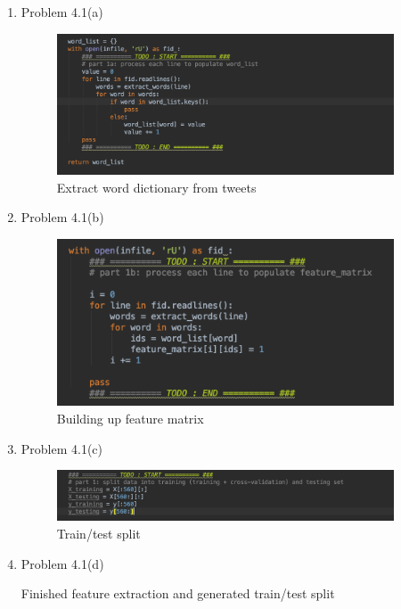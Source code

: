 \documentclass[11pt]{article}
\newcommand{\solution}[1]{{{\color{black}{\bf Solution:} {#1}}}}
\begin{document}
\begin{enumerate}

\item Problem 4.1(a)

\solution{
	
	
	\begin{figure}[h!]
	\centering
	\includegraphics[width = 10cm]{4a}
	\caption{Extract word dictionary from tweets}
	\end{figure}
}

\vspace{2cm}

\item Problem 4.1(b)

\solution{
	
	\begin{figure}[h!]
	\centering
	\includegraphics[width = 10cm]{4b}
	\caption{Building up feature matrix}
	\end{figure}
}

\vspace{2cm}

\item Problem 4.1(c)

\solution{
	
	\begin{figure}[h!]
	\centering
	\includegraphics[width = 10cm]{4d}
	\caption{Train/test split}
	\end{figure}
	
}

\vspace{2cm}

\item Problem 4.1(d)

\solution{
	
	
	Finished feature extraction and generated train/test split

}

\end{enumerate}
\end{document}
